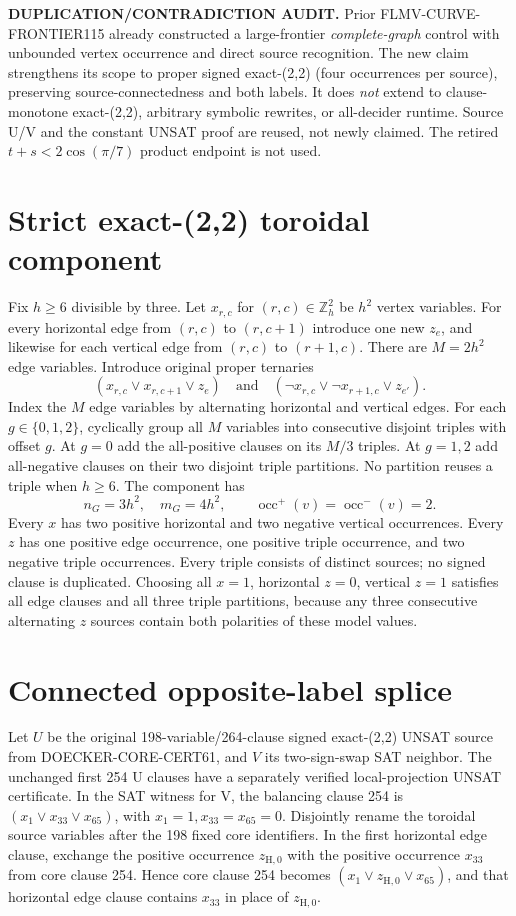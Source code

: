 \documentclass[11pt]{article}
\begin{document}
\noindent\textbf{DUPLICATION/CONTRADICTION AUDIT.}
Prior FLMV-CURVE-FRONTIER115 already constructed a large-frontier \emph{complete-graph} control with unbounded vertex occurrence and direct source recognition. The new claim strengthens its scope to proper signed exact-(2,2) (four occurrences per source), preserving source-connectedness and both labels. It does \emph{not} extend to clause-monotone exact-(2,2), arbitrary symbolic rewrites, or all-decider runtime. Source U/V and the constant UNSAT proof are reused, not newly claimed. The retired \(t+s<2\cos(\pi/7)\) product endpoint is not used.

\section{Strict exact-(2,2) toroidal component}
Fix \(h\ge6\) divisible by three. Let \(x_{r,c}\) for \((r,c)\in\mathbb Z_h^2\) be \(h^2\) vertex variables. For every horizontal edge from \((r,c)\) to \((r,c+1)\) introduce one new \(z_e\), and likewise for each vertical edge from \((r,c)\) to \((r+1,c)\). There are \(M=2h^2\) edge variables. Introduce original proper ternaries
\[
(x_{r,c}\vee x_{r,c+1}\vee z_e)\quad\text{and}\quad
(\neg x_{r,c}\vee\neg x_{r+1,c}\vee z_{e'}).
\]
Index the \(M\) edge variables by alternating horizontal and vertical edges. For each \(g\in\{0,1,2\}\), cyclically group all \(M\) variables into consecutive disjoint triples with offset \(g\). At \(g=0\) add the all-positive clauses on its \(M/3\) triples. At \(g=1,2\) add all-negative clauses on their two disjoint triple partitions. No partition reuses a triple when \(h\ge6\). The component has
\[
 n_G=3h^2,\quad m_G=4h^2,\qquad
\operatorname{occ}^{+}(v)=\operatorname{occ}^{-}(v)=2.
\]
Every \(x\) has two positive horizontal and two negative vertical occurrences. Every \(z\) has one positive edge occurrence, one positive triple occurrence, and two negative triple occurrences. Every triple consists of distinct sources; no signed clause is duplicated. Choosing all \(x=1\), horizontal \(z=0\), vertical \(z=1\) satisfies all edge clauses and all three triple partitions, because any three consecutive alternating \(z\) sources contain both polarities of these model values.

\section{Connected opposite-label splice}
Let \(U\) be the original 198-variable/264-clause signed exact-(2,2) UNSAT source from DOECKER-CORE-CERT61, and \(V\) its two-sign-swap SAT neighbor. The unchanged first 254 U clauses have a separately verified local-projection UNSAT certificate. In the SAT witness for V, the balancing clause 254 is \((x_1\vee x_{33}\vee x_{65})\), with \(x_1=1,x_{33}=x_{65}=0\). Disjointly rename the toroidal source variables after the 198 fixed core identifiers. In the first horizontal edge clause, exchange the positive occurrence \(z_{\mathrm H,0}\) with the positive occurrence \(x_{33}\) from core clause 254. Hence core clause 254 becomes \((x_1\vee z_{\mathrm H,0}\vee x_{65})\), and that horizontal edge clause contains \(x_{33}\) in place of \(z_{\mathrm H,0}\).
\end{document}
